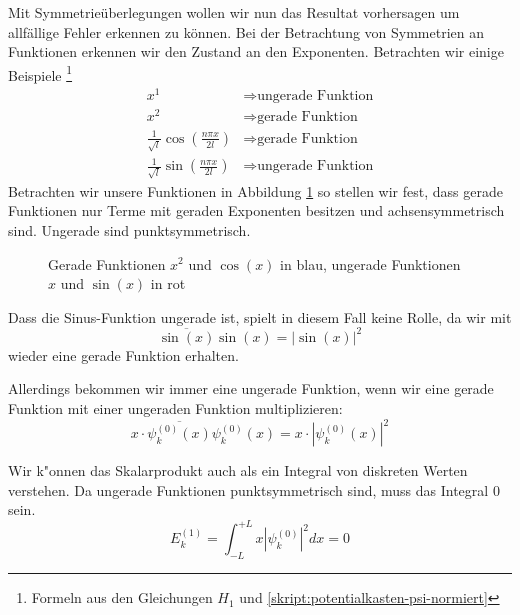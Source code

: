 \begin{refsection}
Mit Symmetrie\"uberlegungen wollen wir nun das Resultat vorhersagen um allf\"allige Fehler erkennen zu k\"onnen.
Bei der Betrachtung von Symmetrien an Funktionen erkennen wir den Zustand an den Exponenten.
Betrachten wir einige Beispiele 
\footnote{Formeln aus den Gleichungen $H_1$ und \ref{skript:potentialkasten-psi-normiert}}
\begin{equation}
\begin{aligned}
x^1 &\Rightarrow \text{ungerade Funktion}
\\
x^2 &\Rightarrow \text{gerade Funktion}
\\
\frac{1}{\sqrt{l}}\cos\left( \frac{n \pi x}{2l} \right)  &\Rightarrow \text{gerade Funktion}
\\
\frac{1}{\sqrt{l}}\sin\left( \frac{n \pi x}{2l} \right)  &\Rightarrow \text{ungerade Funktion}
\end{aligned}
\end{equation}
Betrachten wir unsere Funktionen in Abbildung \ref{abb:efeld_gerade_ungerade} so stellen wir fest, 
dass gerade Funktionen nur Terme mit geraden Exponenten besitzen und achsensymmetrisch sind.
Ungerade sind punktsymmetrisch.

\begin{figure}
  \centering
{}
 \caption{Gerade Funktionen $x^2$ und $\cos(x)$ in blau, ungerade Funktionen $x$ und $\sin(x)$ in rot}
 \label{abb:efeld_gerade_ungerade}
\end{figure}

Dass die Sinus-Funktion ungerade ist, spielt in diesem Fall keine Rolle, da wir mit 
\[
  \overline{\sin(x)} \sin(x) = |\sin(x)|^2
\]
wieder eine gerade Funktion erhalten.

Allerdings bekommen wir immer eine ungerade Funktion, wenn wir eine gerade Funktion mit einer ungeraden Funktion multiplizieren:
\[ 
  x \cdot \overline{\psi_k^{(0)}(x)} \psi_k^{(0)}(x) = x \cdot |\psi_k^{(0)}(x)|^2
\]

Wir k"onnen das Skalarprodukt auch als ein Integral von diskreten Werten verstehen.
Da ungerade Funktionen punktsymmetrisch sind, muss das Integral $0$ sein.
\[
  E_k^{(1)} = \int_{-L}^{+L} x |\psi_k^{(0)}|^2 dx = 0
\]


\end{refsection}
